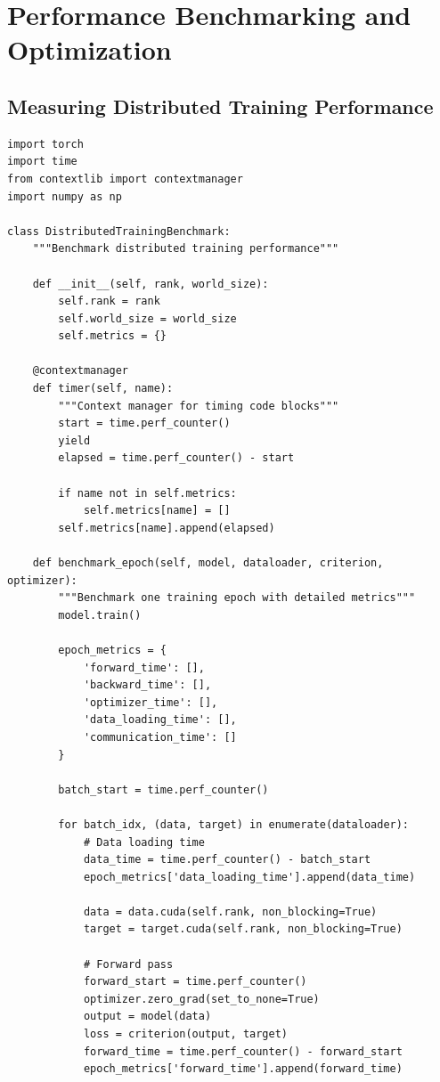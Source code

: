 \section{Performance Benchmarking and Optimization}

\subsection{Measuring Distributed Training Performance}

\begin{lstlisting}[style=python, caption=Comprehensive performance benchmarking]
import torch
import time
from contextlib import contextmanager
import numpy as np

class DistributedTrainingBenchmark:
    """Benchmark distributed training performance"""

    def __init__(self, rank, world_size):
        self.rank = rank
        self.world_size = world_size
        self.metrics = {}

    @contextmanager
    def timer(self, name):
        """Context manager for timing code blocks"""
        start = time.perf_counter()
        yield
        elapsed = time.perf_counter() - start

        if name not in self.metrics:
            self.metrics[name] = []
        self.metrics[name].append(elapsed)

    def benchmark_epoch(self, model, dataloader, criterion, optimizer):
        """Benchmark one training epoch with detailed metrics"""
        model.train()

        epoch_metrics = {
            'forward_time': [],
            'backward_time': [],
            'optimizer_time': [],
            'data_loading_time': [],
            'communication_time': []
        }

        batch_start = time.perf_counter()

        for batch_idx, (data, target) in enumerate(dataloader):
            # Data loading time
            data_time = time.perf_counter() - batch_start
            epoch_metrics['data_loading_time'].append(data_time)

            data = data.cuda(self.rank, non_blocking=True)
            target = target.cuda(self.rank, non_blocking=True)

            # Forward pass
            forward_start = time.perf_counter()
            optimizer.zero_grad(set_to_none=True)
            output = model(data)
            loss = criterion(output, target)
            forward_time = time.perf_counter() - forward_start
            epoch_metrics['forward_time'].append(forward_time)


\end{lstlisting}
